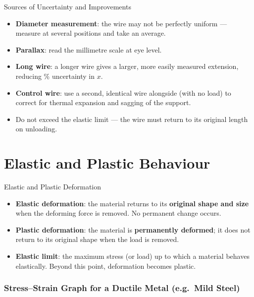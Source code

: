 \begin{keybox}{Sources of Uncertainty and Improvements}
\begin{itemize}[itemsep=2pt]
  \item \textbf{Diameter measurement}: the wire may not be perfectly uniform — measure at several positions and take an average.
  \item \textbf{Parallax}: read the millimetre scale at eye level.
  \item \textbf{Long wire}: a longer wire gives a larger, more easily measured extension, reducing \% uncertainty in $x$.
  \item \textbf{Control wire}: use a second, identical wire alongside (with no load) to correct for thermal expansion and sagging of the support.
  \item Do not exceed the elastic limit — the wire must return to its original length on unloading.
\end{itemize}
\end{keybox}

\section{Elastic and Plastic Behaviour}

\begin{definitionbox}{Elastic and Plastic Deformation}
\begin{itemize}[itemsep=3pt]
  \item \textbf{Elastic deformation}: the material returns to its \textbf{original shape and size} when the deforming force is removed. No permanent change occurs.
  \item \textbf{Plastic deformation}: the material is \textbf{permanently deformed}; it does not return to its original shape when the load is removed.
  \item \textbf{Elastic limit}: the maximum stress (or load) up to which a material behaves elastically. Beyond this point, deformation becomes plastic.
\end{itemize}
\end{definitionbox}

\subsubsection*{Stress--Strain Graph for a Ductile Metal (e.g.\ Mild Steel)}

\vspace{4em}

